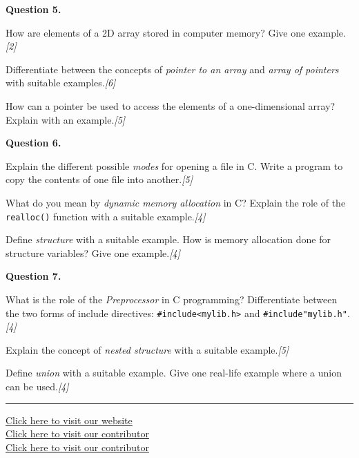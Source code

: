 \documentclass[11pt,a4paper]{article}
\newcommand{\pts}[1]{\hfill   \textit{[#1]}}
\begin{document}
\bigskip




\noindent   \textbf{Question 5.}

\begin{parts}
  \item How are elements of a 2D array stored in computer memory? Give one example.\pts{2}
  \item Differentiate between the concepts of \emph{pointer to an array} and \emph{array of pointers} with suitable examples.\pts{6}
  \item How can a pointer be used to access the elements of a one-dimensional array? Explain with an example.\pts{5}
\end{parts}

\bigskip




\noindent   \textbf{Question 6.}

\begin{parts}
  \item Explain the different possible \emph{modes} for opening a file in C. Write a program to copy the contents of one file into another.\pts{5}
  \item What do you mean by \emph{dynamic memory allocation} in C? Explain the role of the   \texttt{realloc()} function with a suitable example.\pts{4}
  \item Define \emph{structure} with a suitable example. How is memory allocation done for structure variables? Give one example.\pts{4}
\end{parts}

\bigskip




\noindent   \textbf{Question 7.}

\begin{parts}
  \item What is the role of the \emph{Preprocessor} in C programming? Differentiate between the two forms of include directives:   \texttt{\#include<mylib.h>} and   \texttt{\#include"mylib.h"}.\pts{4}
  \item Explain the concept of \emph{nested structure} with a suitable example.\pts{5}
  \item Define \emph{union} with a suitable example. Give one real-life example where a union can be used.\pts{4}
\end{parts}

\vfill
\rule{\linewidth}{0.4pt}

\begin{center}\small
  \href{https://bhu-exam.vercel.app/}{Click here to visit our website}\\[4pt]
  \href{https://me-aryan.vercel.app/}{Click here to visit our contributor}\\[4pt]
  \href{https://quashan-me.vercel.app/}{Click here to visit our contributor}
\end{center}
\end{document}
